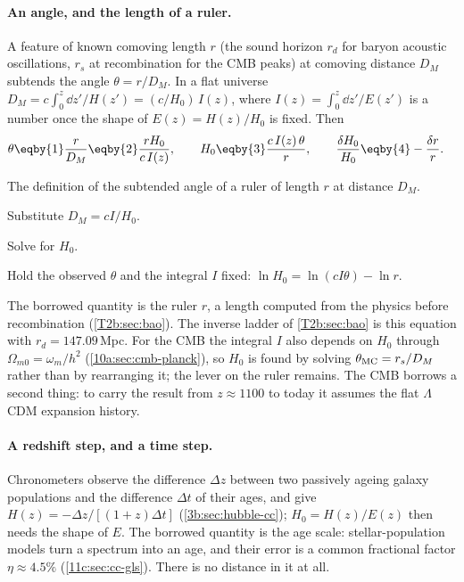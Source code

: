\paragraph{An angle, and the length of a ruler.} A feature of known comoving length $r$
(the sound horizon $r_d$ for baryon acoustic oscillations, $r_s$ at recombination for the CMB
peaks) at comoving distance $D_M$ subtends the angle $\theta=r/D_M$. In a flat universe
$D_M=c\int_0^z\dd z'/H(z')=(c/H_0)\,I(z)$, where $I(z)=\int_0^z\dd z'/E(z')$ is a number
once the shape of $E(z)=H(z)/H_0$ is fixed. Then
\begin{align}
  \theta
  &\eqby{1}\frac{r}{D_M}
   \eqby{2}\frac{rH_0}{c\,I(z)},\qquad
  H_0\eqby{3}\frac{c\,I(z)\,\theta}{r},\qquad
  \frac{\delta H_0}{H_0}\eqby{4}-\frac{\delta r}{r}.
  \label{11c:eq:h0-ruler}
\end{align}
\begin{explain}
  \item The definition of the subtended angle of a ruler of length $r$ at distance $D_M$.
  \item Substitute $D_M=cI/H_0$.
  \item Solve for $H_0$.
  \item Hold the observed $\theta$ and the integral $I$ fixed: $\ln H_0=\ln(cI\theta)-\ln r$.
\end{explain}
The borrowed quantity is the ruler $r$, a length computed from the physics before
recombination (\cref{T2b:sec:bao}). The inverse ladder of \cref{T2b:sec:bao} is this equation with
$r_d=147.09$\,Mpc. For the CMB the integral $I$ also depends on $H_0$ through
$\Omega_{m0}=\omega_m/h^2$ (\cref{10a:sec:cmb-planck}), so $H_0$ is found by solving
$\theta_{\rm MC}=r_s/D_M$ rather than by rearranging it; the lever on the ruler remains.
The CMB borrows a second thing: to carry the result from $z\approx1100$ to today it
assumes the flat $\Lambda$CDM expansion history.

\paragraph{A redshift step, and a time step.} Chronometers observe the difference $\Delta z$
between two passively ageing galaxy populations and the difference $\Delta t$ of their ages,
and give $H(z)=-\Delta z/[(1+z)\Delta t]$ (\cref{3b:sec:hubble-cc}); $H_0=H(z)/E(z)$ then needs
the shape of $E$. The borrowed quantity is the age scale: stellar-population models turn a
spectrum into an age, and their error is a common fractional factor $\eta\approx4.5\%$
(\cref{11c:sec:cc-gls}). There is no distance in it at all.

